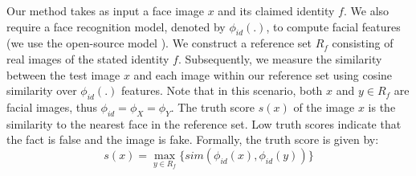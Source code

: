 \documentclass{article} \usepackage{iclr2024_conference,times}
\begin{document}
Our method takes as input a face image $x$ and its claimed identity $f$. We also require a face recognition model, denoted by $\phi_{id}(.)$, to compute facial features (we use the open-source model \citet{attention_face_recognition}). We construct a reference set $R_f$ consisting of real images of the stated identity $f$. Subsequently, we measure the similarity between the test image $x$ and each image within our reference set using cosine similarity over $\phi_{id}(.)$ features. Note that in this scenario, both $x$ and $y \in R_f$ are facial images, thus $\phi_{id}=\phi_{X}=\phi_{Y}$. The truth score $s(x)$ of the image $x$ is the similarity to the nearest face in the reference set. Low truth scores indicate that the fact is false and the image is fake. Formally, the truth score is given by:
\begin{equation*}
    s(x) = \max_{y\in R_f} \{sim(\phi_{id}(x), \phi_{id}(y))\}
\end{equation*}
\begin{table}[t]
\caption{Performance comparison (average ROC-AUC \%) of baseline methods on the DFDC dataset, evaluating their ability to detect zero-day deepfake attacks. Our method outperforms supervised baselines, underscoring its robustness to previously unseen manipulation techniques. A and B are two distinct deepfake generation methods.}
\vspace{-0.75em}
\label{tab:faces_generalization}
\begin{center}
\end{center}
\vspace{-0.25em}
\end{table}
\end{document}
